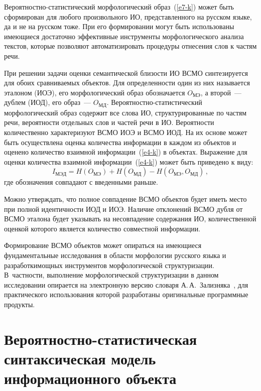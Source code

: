 \begin{multicols}{2}
   Вероятностно-ста\-ти\-сти\-че\-ский морфологический
образ~(\ref{e7-k}) может быть сформирован для любого произвольного 
ИО, представленного на русском языке, да и не на 
русском тоже. При его формировании могут быть использованы имеющиеся 
достаточно эффективные инструменты морфологического анализа текстов, 
которые позволяют автоматизировать процедуры отнесения слов к частям 
речи. 
   
   При решении задачи оценки семантической близости 
ИО ВСМО синтезируется для обоих сравниваемых объектов. Для 
определенности один из них называется эталоном (ИОЭ), его 
морфологический образ обозначается $O_{\mathrm{МЭ}}$, а второй~--- дублем 
(ИОД), его образ~--- $O_{\mathrm{МД}}$. Ве\-ро\-ят\-но\-ст\-но-ста\-ти\-сти\-че\-ский 
морфологический образ содержит все слова ИО, 
структурированные по частям речи, ве\-ро\-ят\-ности отдельных слов и частей 
речи в ИО. Ве\-ро\-ят\-ности количественно характеризуют ВСМО ИОЭ и ВСМО 
ИОД. На их основе может быть осуществлена оценка количества 
информации в каждом из объектов и оценено количество взаимной 
информации~(\ref{e4-k}) в объектах. Выражение для оценки количества 
взаимной информации~(\ref{e4-k}) может быть приведено к виду:
   \begin{equation}
   I_{\mathrm{МЭД}} = H(O_{\mathrm{МЭ}}) + H(O_{\mathrm{МД}})- 
H(O_{\mathrm{МЭ}}, O_{\mathrm{МД}})\,,
   \label{e8-k}
   \end{equation}
где обозначения совпадают с введенными раньше. 
   
   Можно утверждать, что полное совпадение ВСМО объектов будет иметь 
место при полной идентичности ИОД и ИОЭ. Наличие отклонений ВСМО 
дубля от ВСМО эталона будет указывать на несовпадение содержания ИО, 
количественной оценкой которого является количество совместной 
информации. 
   
   Формирование ВСМО объектов может опираться на имеющиеся 
фундаментальные исследования в области морфологии русского языка и 
разработки\linebreak мощных инструментов морфологической структуризации. 
В~частности, выполнение морфологической структуризации в данном 
исследовании опирает\-ся на электронную версию словаря 
А.\,А.~Зализняка~\cite{10-k}, для практического использования которой 
разработаны оригинальные программные продукты. 

\section{Вероятностно-статистическая синтаксическая модель 
информационного объекта}
   

\end{multicols}
